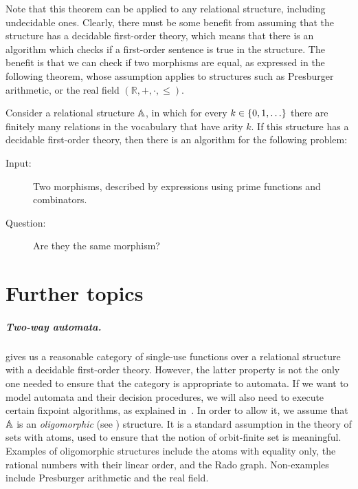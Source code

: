\documentclass[a4paper,UKenglish,cleveref, autoref, numberwithinsect, thm-restate]{lipics-v2021}
\begin{document}
Note that this  theorem can be applied to any relational structure, including undecidable ones. Clearly, there must be some benefit from assuming that the structure has a decidable first-order theory, which means that there is an algorithm which checks if a first-order sentence is true in the structure. 
The benefit is that we can check if two morphisms are equal, as expressed in the following theorem, whose assumption applies to structures such as Presburger arithmetic, or the real field $(\mathbb R, +, \cdot, \leq)$.

\begin{theorem}\label{thm:first-order-decidable}
    Consider a relational structure $\mathbb A$, in which for every $k \in \{0,1,\ldots\}$ there are finitely many relations in the vocabulary that have arity $k$. If this structure has a decidable first-order theory, then there is an algorithm for the following problem:
    \begin{description}
        \item[Input:] Two morphisms, described by expressions using prime functions and combinators.
        \item[Question:] Are they the same morphism?
    \end{description}
\end{theorem}



\section{Further topics}
\label{sec:further-topics}

\subparagraph{Two-way automata.}

 gives us a reasonable category of single-use functions over a relational structure with a decidable first-order theory. 
However, the latter property is not the only one needed to ensure that the category is appropriate to automata. If we want to model automata and their decision procedures, we will also need to execute certain fixpoint algorithms, as explained in~\cite{bojanczyk_slightly2018}.
In order to allow it, we assume that $\mathbb A$ is an \emph{oligomorphic} (see \cite[Definition~3.9]{bojanczyk_slightly2018}) structure.
It is a standard assumption in the theory of sets with atoms, used to ensure that the notion of orbit-finite set is meaningful.
Examples of oligomorphic structures include the atoms with equality only, the rational numbers with their linear order, and the Rado graph. Non-examples include Presburger arithmetic and the real field. 
\end{document}
